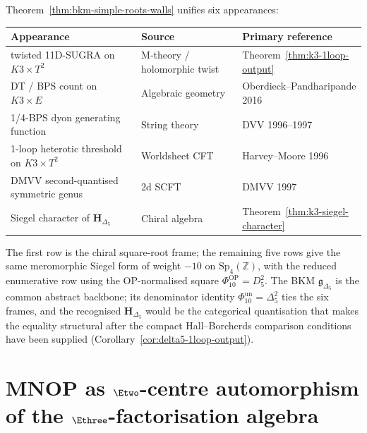 \begin{remark}
\label{rem:five-appearances-phi-10-unified}
Theorem~\ref{thm:bkm-simple-roots-walls} unifies six appearances:
\begin{center}
\renewcommand{\arraystretch}{1.3}
\begin{tabular}{@{}lll@{}}
\textbf{Appearance} & \textbf{Source} & \textbf{Primary reference} \\ \hline
twisted 11D-SUGRA on $K3\times T^2$ & M-theory / holomorphic twist & Theorem~\ref{thm:k3-1loop-output} \\
DT / BPS count on $K3\times E$ & Algebraic geometry & Oberdieck--Pandharipande 2016 \\
1/4-BPS dyon generating function & String theory & DVV 1996--1997 \\
1-loop heterotic threshold on $K3\times T^2$ & Worldsheet CFT & Harvey--Moore 1996 \\
DMVV second-quantised symmetric genus & 2d SCFT & DMVV 1997 \\
Siegel character of $\mathbf{H}_{\Delta_5}$ & Chiral algebra & Theorem~\ref{thm:k3-siegel-character}
\end{tabular}
\end{center}
The first row is the chiral square-root frame; the remaining five rows give
the same meromorphic Siegel form of weight $-10$ on $\mathrm{Sp}_4(\mathbb{Z})$,
with the reduced enumerative row using the OP-normalised square
\(\Phi_{10}^{\mathrm{OP}}=D_5^2\).
The BKM $\mathfrak{g}_{\Delta_5}$ is the common abstract backbone; its
denominator identity \(\Phi_{10}^{\mathrm{un}}=\Delta_5^2\) ties the six frames, and
the recognised $\mathbf{H}_{\Delta_5}$ would be the categorical
quantisation that makes the equality structural after the compact
Hall--Borcherds comparison conditions have been supplied
(Corollary~\ref{cor:delta5-1loop-output}).
\end{remark}

\section{MNOP as \texorpdfstring{$\Etwo$}{E2}-centre automorphism of the \texorpdfstring{$\Ethree$}{Ethree}-factorisation algebra}
\label{sec:mnop-e3-trace-centre}

